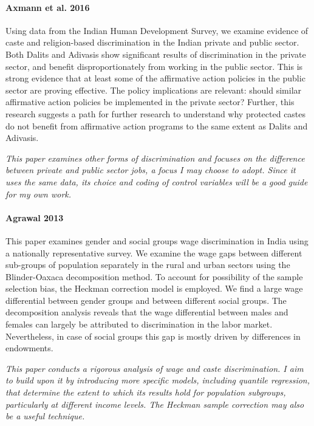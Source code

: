 \documentclass[a4paper]{article}
\begin{document}
\paragraph{Axmann et al. 2016} Using data from the Indian Human Development Survey, we examine evidence of caste and religion-based discrimination in the Indian private and public sector. Both Dalits and Adivasis show significant results of discrimination in the private sector, and benefit disproportionately from working in the public sector. This is strong evidence that at least some of the affirmative action policies in the public sector are proving effective. The policy implications are relevant: should similar affirmative action policies be implemented in the private sector? Further, this research suggests a path for further research to understand why protected castes do not benefit from affirmative action programs to the same extent as Dalits and Adivasis.

\textit{This paper examines other forms of discrimination and focuses on the difference between private and public sector jobs, a focus I may choose to adopt. Since it uses the same data, its choice and coding of control variables will be a good guide for my own work.}

\paragraph{Agrawal 2013} This paper examines gender and social groups wage discrimination in India using a nationally representative survey. We examine the wage gaps between different sub-groups of population separately in the rural and urban sectors using the Blinder-Oaxaca decomposition method. To account for possibility of the sample selection bias, the Heckman correction model is employed. We find a large wage differential between gender groups and between different social groups. The decomposition analysis reveals that the wage differential between males and females can largely be attributed to discrimination in the labor market. Nevertheless, in case of social groups this gap is mostly driven by differences in endowments.

\textit{This paper conducts a rigorous analysis of wage and caste discrimination. I aim to build upon it by introducing more specific models, including quantile regression, that determine the extent to which its results hold for population subgroups, particularly at different income levels. The Heckman sample correction may also be a useful technique.}
\end{document}
